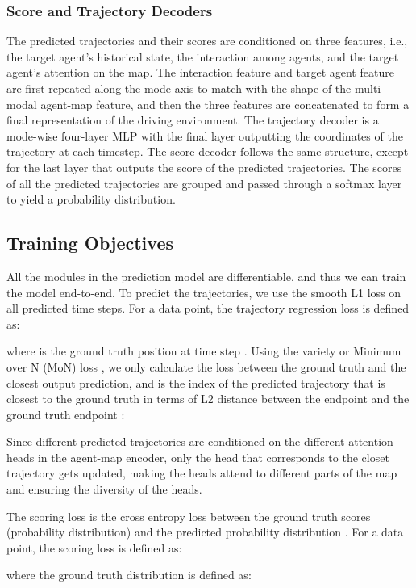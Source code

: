 \documentclass[letterpaper, 10 pt, conference]{ieeeconf}
\begin{document}
\subsubsection{Score and Trajectory Decoders}
The predicted trajectories and their scores are conditioned on three features, i.e., the target agent's historical state, the interaction among agents, and the target agent's attention on the map. The interaction feature and target agent feature are first repeated along the mode axis to match with the shape of the multi-modal agent-map feature, and then the three features are concatenated to form a final representation of the driving environment. The trajectory decoder is a mode-wise four-layer MLP with the final layer outputting the coordinates of the trajectory at each timestep. The score decoder follows the same structure, except for the last layer that outputs the score of the predicted trajectories. The scores of all the predicted trajectories are grouped and passed through a softmax layer to yield a probability distribution.

\subsection{Training Objectives} 
All the modules in the prediction model are differentiable, and thus we can train the model end-to-end. To predict the trajectories, we use the smooth L1 loss on all predicted time steps. For a data point, the trajectory regression loss is defined as:

where  is the ground truth position at time step . Using the variety or Minimum over N (MoN) loss \cite{thiede2019analyzing}, we only calculate the loss between the ground truth and the closest output prediction, and  is the index of the predicted trajectory that is closest to the ground truth in terms of L2 distance between the endpoint  and the ground truth endpoint :


Since different predicted trajectories are conditioned on the different attention heads in the agent-map encoder, only the head that corresponds to the closet trajectory gets updated, making the heads attend to different parts of the map and ensuring the diversity of the heads.

The scoring loss is the cross entropy loss between the ground truth scores (probability distribution) and the predicted probability distribution . For a data point, the scoring loss is defined as:

where the ground truth distribution  is defined as:
\end{document}
